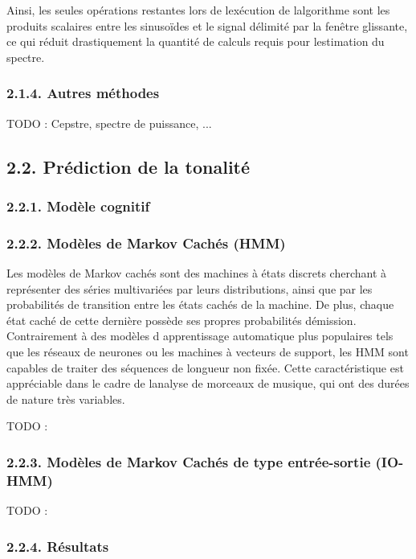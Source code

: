 \documentclass[letterpaper]{article}
\begin{document}
Ainsi, les seules opérations restantes lors de l\textquotesingle exécution de l\textquotesingle algorithme sont les produits scalaires entre les
sinusoïdes et le signal délimité par la fenêtre glissante, ce qui réduit drastiquement la quantité de calculs requis pour l\textquotesingle estimation du spectre.

\subsubsection*{2.1.4. Autres méthodes}

TODO : Cepstre, spectre de puissance, ...

\subsection*{2.2. Prédiction de la tonalité}

\subsubsection*{2.2.1. Modèle cognitif}

\subsubsection*{2.2.2. Modèles de Markov Cachés (HMM)}

Les modèles de Markov cachés sont des machines à états discrets cherchant à représenter des séries multivariées par
leurs distributions, ainsi que par les probabilités de transition entre les états cachés de la machine. De plus, chaque état
caché de cette dernière possède ses propres probabilités d\textquotesingle émission. Contrairement à des modèles d\textquotesingle
apprentissage automatique plus populaires tels que les réseaux de neurones ou les machines à vecteurs de support,
les HMM sont capables de traiter des séquences de longueur non fixée. Cette caractéristique est appréciable dans le cadre
de l\textquotesingle analyse de morceaux de musique, qui ont des durées de nature très variables.

TODO : \citep{JP} \citep{DR}

\subsubsection*{2.2.3. Modèles de Markov Cachés de type entrée-sortie (IO-HMM)}

TODO : \citep{YB}

\subsubsection*{2.2.4. Résultats}
\end{document}
